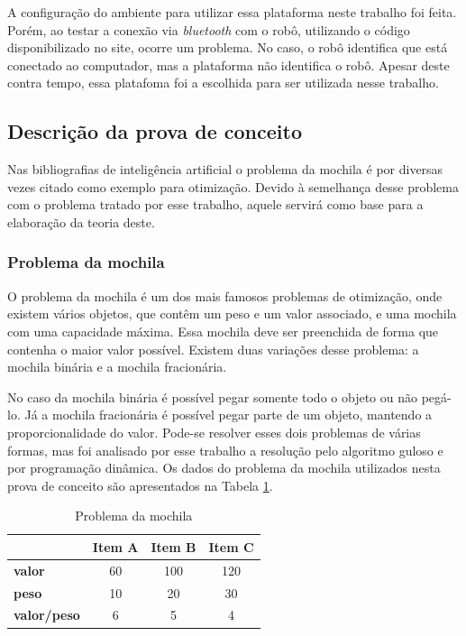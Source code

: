 A configuração do ambiente para utilizar essa plataforma neste trabalho foi feita. Porém, ao testar a conexão via \textit{bluetooth} com o robô, utilizando o código disponibilizado no site, ocorre um problema. No caso, o robô identifica que está conectado ao computador, mas a plataforma não identifica o robô. Apesar deste contra tempo, essa platafoma foi a escolhida para ser utilizada nesse trabalho.

\subsection{Descrição da prova de conceito}
Nas bibliografias de inteligência artificial o problema da mochila é por diversas vezes citado como exemplo para otimização. Devido à semelhança desse problema com o problema tratado por esse trabalho, aquele servirá como base para a elaboração da teoria deste.
 
\subsubsection{Problema da mochila}
O problema da mochila é um dos mais famosos problemas de otimização, onde existem vários objetos, que contêm um peso e um valor associado, e uma mochila com uma capacidade máxima. Essa mochila deve ser preenchida de forma que contenha o maior valor possível. Existem duas variações desse problema: a mochila binária e a mochila fracionária.

No caso da mochila binária é possível pegar somente todo o objeto ou não pegá-lo. Já a mochila fracionária é possível pegar parte de um objeto, mantendo a proporcionalidade do valor. Pode-se resolver esses dois problemas de várias formas, mas foi analisado por esse trabalho a resolução pelo algoritmo guloso e por programação dinâmica. Os dados do problema da mochila utilizados nesta prova de conceito são apresentados na Tabela \ref{knapsack}.

\FloatBarrier
\begin{table}[!h]
	\centering	
	\begin{tabular}{lccc}
		\toprule
		& \textbf{Item A} & \textbf{Item B} & \textbf{Item C} \\
		\midrule
		\textbf{valor} & 60 & 100 & 120 \\
		\midrule
		\textbf{peso} & 10 & 20 & 30 \\
		\midrule
		\textbf{valor/peso} & 6 & 5 & 4 \\
		\bottomrule
	\end{tabular}
	\caption{Problema da mochila}
	\label{knapsack}
\end{table}


